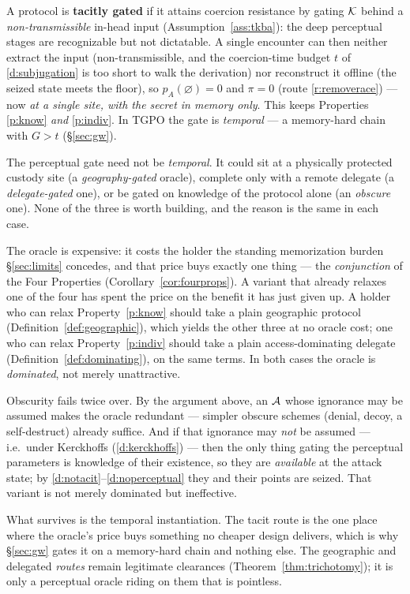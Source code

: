 \begin{definition}\label{def:tacit}
A protocol is \textbf{tacitly gated} if it attains coercion resistance by gating
$\mathcal{K}$ behind a \emph{non-transmissible} in-head input (Assumption~\ref{ass:tkba}):
the deep perceptual stages are recognizable but not dictatable. A single encounter
can then neither extract the input (non-transmissible, and the coercion-time budget
$t$ of \ref{d:subjugation} is too short to walk the derivation) nor reconstruct it offline (the
seized state meets the floor), so $p_A(\varnothing) = 0$ and $\pi = 0$ (route \ref{r:removerace})
--- now \emph{at a single site, with the secret in memory only}. This keeps
Properties \ref{p:know} \emph{and} \ref{p:indiv}. In TGPO the gate is \emph{temporal} --- a memory-hard
chain with $G > t$ (\S\ref{sec:gw}).
\end{definition}

\begin{remark}\label{rem:po-variants}
The perceptual gate need not be \emph{temporal}. It could sit at a physically
protected custody site (a \emph{geography-gated} oracle), complete only with a
remote delegate (a \emph{delegate-gated} one), or be gated on knowledge of the
protocol alone (an \emph{obscure} one). None of the three is worth building, and
the reason is the same in each case.

The oracle is expensive: it costs the holder the standing memorization burden
\S\ref{sec:limits} concedes, and that price buys exactly one thing --- the
\emph{conjunction} of the Four Properties (Corollary~\ref{cor:fourprops}). A
variant that already relaxes one of the four has spent the price on the benefit it
has just given up. A holder who can relax Property~\ref{p:know} should take a
plain geographic protocol (Definition~\ref{def:geographic}), which yields the
other three at no oracle cost; one who can relax Property~\ref{p:indiv} should
take a plain access-dominating delegate (Definition~\ref{def:dominating}), on the
same terms. In both cases the oracle is \emph{dominated}, not merely
unattractive.

Obscurity fails twice over. By the argument above, an $\mathcal{A}$ whose ignorance
may be assumed makes the oracle redundant --- simpler obscure schemes (denial,
decoy, a self-destruct) already suffice. And if that ignorance may \emph{not} be
assumed --- i.e.\ under Kerckhoffs (\ref{d:kerckhoffs}) --- then the only thing
gating the perceptual parameters is knowledge of their existence, so they are
\emph{available} at the attack state; by \ref{d:notacit}--\ref{d:noperceptual}
they and their points are seized. That variant is not merely dominated but
ineffective.

What survives is the temporal instantiation. The tacit route is the one place
where the oracle's price buys something no cheaper design delivers, which is why
\S\ref{sec:gw} gates it on a memory-hard chain and nothing else. The geographic
and delegated \emph{routes} remain legitimate clearances
(Theorem~\ref{thm:trichotomy}); it is only a perceptual oracle riding on them that
is pointless.
\end{remark}

